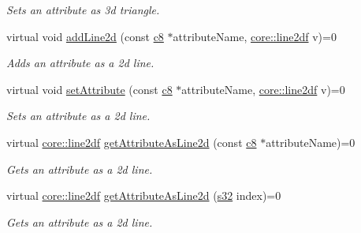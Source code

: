 \begin{DoxyCompactItemize}
\begin{DoxyCompactList}\small\item\em Sets an attribute as 3d triangle. \end{DoxyCompactList}\item 
\mbox{\label{classirr_1_1io_1_1IAttributes_abf98be37e1be44dfde1f5a34c2e31240}} 
virtual void \hyperlink{classirr_1_1io_1_1IAttributes_abf98be37e1be44dfde1f5a34c2e31240}{add\+Line2d} (const \hyperlink{namespaceirr_a9395eaea339bcb546b319e9c96bf7410}{c8} $\ast$attribute\+Name, \hyperlink{namespaceirr_1_1core_aeb733b0cceca2d174bf42ad477566204}{core\+::line2df} v)=0
\begin{DoxyCompactList}\small\item\em Adds an attribute as a 2d line. \end{DoxyCompactList}\item 
\mbox{\label{classirr_1_1io_1_1IAttributes_aedfdad4b7196cb04dc45c9b4ab5a15f5}} 
virtual void \hyperlink{classirr_1_1io_1_1IAttributes_aedfdad4b7196cb04dc45c9b4ab5a15f5}{set\+Attribute} (const \hyperlink{namespaceirr_a9395eaea339bcb546b319e9c96bf7410}{c8} $\ast$attribute\+Name, \hyperlink{namespaceirr_1_1core_aeb733b0cceca2d174bf42ad477566204}{core\+::line2df} v)=0
\begin{DoxyCompactList}\small\item\em Sets an attribute as a 2d line. \end{DoxyCompactList}\item 
virtual \hyperlink{namespaceirr_1_1core_aeb733b0cceca2d174bf42ad477566204}{core\+::line2df} \hyperlink{classirr_1_1io_1_1IAttributes_ace0d40cce5fad56cbe030d63c5743854}{get\+Attribute\+As\+Line2d} (const \hyperlink{namespaceirr_a9395eaea339bcb546b319e9c96bf7410}{c8} $\ast$attribute\+Name)=0
\begin{DoxyCompactList}\small\item\em Gets an attribute as a 2d line. \end{DoxyCompactList}\item 
virtual \hyperlink{namespaceirr_1_1core_aeb733b0cceca2d174bf42ad477566204}{core\+::line2df} \hyperlink{classirr_1_1io_1_1IAttributes_aa03235ad3ff3eb4468c424c171ee652f}{get\+Attribute\+As\+Line2d} (\hyperlink{namespaceirr_ac66849b7a6ed16e30ebede579f9b47c6}{s32} index)=0
\begin{DoxyCompactList}\small\item\em Gets an attribute as a 2d line. \end{DoxyCompactList}\item 

\end{DoxyCompactItemize}
